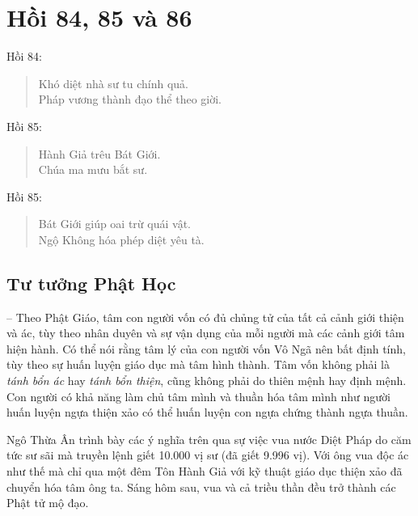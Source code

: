 \chapter{Hồi 84, 85 và 86} %
\label{cha:hoi_84_85}

Hồi 84:

\begin{verse}
\begin{itshape}
Khó diệt nhà sư tu chính quả.\\
Pháp vương thành đạo thể theo giời.
\end{itshape}
\end{verse}

Hồi 85:

\begin{verse}
\begin{itshape}
Hành Giả trêu Bát Giới.\\
Chúa ma mưu bắt sư.
\end{itshape}
\end{verse}

Hồi 85:

\begin{verse}
\begin{itshape}
Bát Giới giúp oai trừ quái vật.\\
Ngộ Không hóa phép diệt yêu tà.
\end{itshape}
\end{verse}

\section{Tư tưởng Phật Học} %
\label{sec:84_85_phat_hoc}

-- Theo Phật Giáo, tâm con người vốn có đủ chủng tử của tất cả cảnh giới thiện và ác, tùy theo nhân duyên và sự vận dụng của mỗi người mà các cảnh giới tâm hiện hành. Có thể nói rằng tâm lý của con người vốn Vô Ngã nên bất định tính, tùy theo sự huấn luyện giáo dục mà tâm hình thành. Tâm vốn không phải là \emph{tánh bổn ác} hay \emph{tánh bổn thiện}, cũng không phải do thiên mệnh hay định mệnh. Con người có khả năng làm chủ tâm mình và thuần hóa tâm mình như người huấn luyện ngựa thiện xảo có thể huấn luyện con ngựa chứng thành ngựa thuần.

Ngô Thừa Ân trình bày các ý nghĩa trên qua sự việc vua nước Diệt Pháp do căm tức sư sãi mà truyền lệnh giết 10.000 vị sư (đã giết 9.996 vị). Với ông vua độc ác như thế mà chỉ qua một đêm Tôn Hành Giả với kỹ thuật giáo dục thiện xảo đã chuyển hóa tâm ông ta. Sáng hôm sau, vua và cả triều thần đều trở thành các Phật tử mộ đạo.

